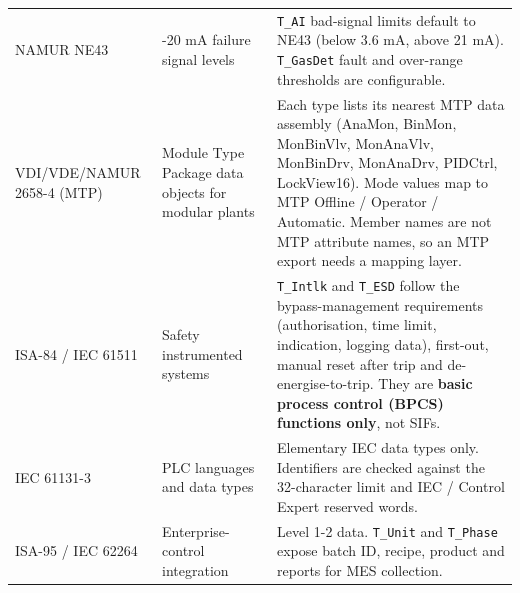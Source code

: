 {\begin{longtable}{@{}>{\raggedright\arraybackslash}p{3.2cm}>{\raggedright\arraybackslash}p{3.4cm}>{\raggedright\arraybackslash}p{7.8cm}@{}}
NAMUR NE43 & 4-20 mA failure signal levels & \texttt{T\_AI} bad-signal limits default to NE43 (below 3.6 mA, above 21 mA). \texttt{T\_GasDet} fault and over-range thresholds are configurable. \\
VDI/\allowbreak{}VDE/\allowbreak{}NAMUR 2658-4 (MTP) & Module Type Package data objects for modular plants & Each type lists its nearest MTP data assembly (AnaMon, BinMon, MonBinVlv, MonAnaVlv, MonBinDrv, MonAnaDrv, PIDCtrl, LockView16). Mode values map to MTP Offline /\allowbreak{} Operator /\allowbreak{} Automatic. Member names are not MTP attribute names, so an MTP export needs a mapping layer. \\
ISA-84 /\allowbreak{} IEC 61511 & Safety instrumented systems & \texttt{T\_Intlk} and \texttt{T\_ESD} follow the bypass-management requirements (authorisation, time limit, indication, logging data), first-out, manual reset after trip and de-energise-to-trip. They are \textbf{basic process control (BPCS) functions only}, not SIFs. \\
IEC 61131-3 & PLC languages and data types & Elementary IEC data types only. Identifiers are checked against the 32-character limit and IEC /\allowbreak{} Control Expert reserved words. \\
ISA-95 /\allowbreak{} IEC 62264 & Enterprise-control integration & Level 1-2 data. \texttt{T\_Unit} and \texttt{T\_Phase} expose batch ID, recipe, product and reports for MES collection. \\
\bottomrule
\end{longtable}
}

